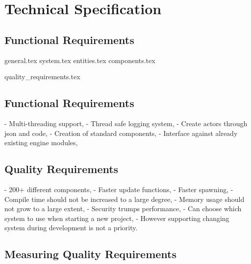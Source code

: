 \documentclass{article}
\begin{document}

\section*{Technical Specification}
\subsection*{Functional Requirements}
{general.tex}
{system.tex}
{entities.tex}
{components.tex}

{quality_requirements.tex}

\subsection*{Functional Requirements}
- Multi-threading support,
- Thread safe logging system,
- Create actors through json and code,
- Creation of standard components,
- Interface against already existing engine modules,

\subsection*{Quality Requirements}
- 200+ different components,
- Faster update functions,
- Faster spawning,
- Compile time should not be increased to a large degree,
- Memory usage should not grow to a large extent,
- Security trumps performance, 
- Can choose which system to use when starting a new project,
    - However supporting changing system during development is not a priority.

\subsection*{Measuring Quality Requirements}
\end{document}
